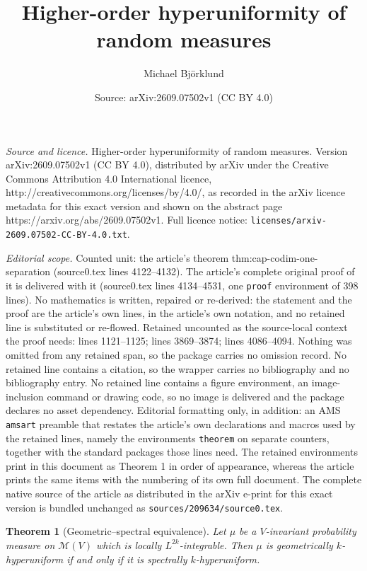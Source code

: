 \documentclass[10pt,a4paper]{amsart}
\title{Higher-order hyperuniformity of random measures}
\author{Michael Bj\"orklund}
\date{Source: arXiv:2609.07502v1 (CC BY 4.0)}
\newtheorem{theorem}{Theorem}
\newcommand{\cM}{\mathcal M}
\begin{document}
\maketitle

\noindent\emph{Source and licence.} Higher-order hyperuniformity of random measures. Version arXiv:2609.07502v1 (CC BY 4.0), distributed by arXiv under the Creative Commons Attribution 4.0 International licence, http://creativecommons.org/licenses/by/4.0/, as recorded in the arXiv licence metadata for this exact version and shown on the abstract page https://arxiv.org/abs/2609.07502v1. Full licence notice: \texttt{licenses/arxiv-2609.07502-CC-BY-4.0.txt}.\par\smallskip

\noindent\textit{Editorial scope.} Counted unit: the article's theorem thm:cap-codim-one-separation (source0.tex lines 4122--4132). The article's complete original proof of it is delivered with it (source0.tex lines 4134--4531, one \texttt{proof} environment of 398 lines). No mathematics is written, repaired or re-derived: the statement and the proof are the article's own lines, in the article's own notation, and no retained line is substituted or re-flowed.  Retained uncounted as the source-local context the proof needs: lines 1121--1125; lines 3869--3874; lines 4086--4094.  Nothing was omitted from any retained span, so the package carries no omission record.  No retained line contains a citation, so the wrapper carries no bibliography and no bibliography entry.  No retained line contains a figure environment, an image-inclusion command or drawing code, so no image is delivered and the package declares no asset dependency.  Editorial formatting only, in addition: an AMS \texttt{amsart} preamble that restates the article's own declarations and macros used by the retained lines, namely the environments \texttt{theorem} on separate counters, together with the standard packages those lines need.  The retained environments print in this document as Theorem 1 in order of appearance, whereas the article prints the same items with the numbering of its own full document.  The complete native source of the article as distributed in the arXiv e-print for this exact version is bundled unchanged as \texttt{sources/209634/source0.tex}.
\begin{theorem}[Geometric--spectral equivalence]\label{thm:geometric-spectral}
Let $\mu$ be a $V$-invariant probability measure on $\cM(V)$ which is
locally $L^{2k}$-integrable.  Then $\mu$ is geometrically $k$-hyperuniform
if and only if it is spectrally $k$-hyperuniform.
\end{theorem}
\end{document}
